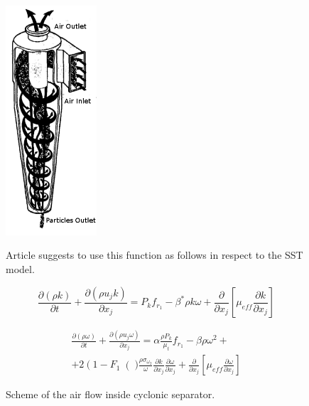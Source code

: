 \documentclass[a4paper]{jpconf}
\begin{document}
\begin{figure}[h]
\begin{minipage}{14pc}
\includegraphics[width=8pc]{flowScheme1.png}\hspace{6pc}
\caption{\label{fig:physicalModel} Scheme of the air flow inside cyclonic separator.}
\end{minipage}
\begin{minipage}{20pc}
Article \cite{Smirnov} suggests to use this function as follows in respect to the SST model.

\begin{equation}
\label{eq:2}
\frac{\partial (\rho k)}{\partial t} + \frac{\partial (\rho u_j k)}{\partial x_j} = P_k f_{r_1} - \beta^* \rho k \omega + \frac{\partial}{\partial x_j} \left[ \mu_{eff}\frac{\partial k}{\partial x_j} \right]
\end{equation}

\begin{equation}
\begin{split}
\frac{\partial (\rho \omega)}{\partial t} + \frac{\partial (\rho u_j \omega)}{\partial x_j} = \alpha \frac{\rho P_k}{\mu_t}f_{r_1}  - \beta \rho \omega^2 +\\
+ 2\left(1-F_1\right()\frac{\rho \sigma_{\omega_2}}{\omega}\frac{\partial k}{\partial x_j}\frac{\partial \omega}{\partial x_j} + \frac{\partial}{\partial x_j} \left[ \mu_{eff}\frac{\partial \omega}{\partial x_j} \right]
\end{split}
\end{equation}


\end{minipage}
\end{figure}
\end{document}
